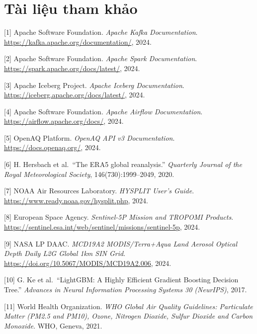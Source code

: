 \documentclass[12pt,a4paper]{article}
\begin{document}
\newpage
\section{Tài liệu tham khảo}\label{tuxe0i-liux1ec7u-tham-khux1ea3o}

{[}1{]} Apache Software Foundation. \emph{Apache Kafka Documentation}. \url{https://kafka.apache.org/documentation/}, 2024.

{[}2{]} Apache Software Foundation. \emph{Apache Spark Documentation}. \url{https://spark.apache.org/docs/latest/}, 2024.

{[}3{]} Apache Iceberg Project. \emph{Apache Iceberg Documentation}. \url{https://iceberg.apache.org/docs/latest/}, 2024.

{[}4{]} Apache Software Foundation. \emph{Apache Airflow Documentation}. \url{https://airflow.apache.org/docs/}, 2024.

{[}5{]} OpenAQ Platform. \emph{OpenAQ API v3 Documentation}. \url{https://docs.openaq.org/}, 2024.

{[}6{]} H. Hersbach et al.~``The ERA5 global reanalysis.'' \emph{Quarterly Journal of the Royal Meteorological Society}, 146(730):1999--2049, 2020.

{[}7{]} NOAA Air Resources Laboratory. \emph{HYSPLIT User's Guide}. \url{https://www.ready.noaa.gov/hysplit.php}, 2024.

{[}8{]} European Space Agency. \emph{Sentinel-5P Mission and TROPOMI Products}. \url{https://sentinel.esa.int/web/sentinel/missions/sentinel-5p}, 2024.

{[}9{]} NASA LP DAAC. \emph{MCD19A2 MODIS/Terra+Aqua Land Aerosol Optical Depth Daily L2G Global 1km SIN Grid}. \url{https://doi.org/10.5067/MODIS/MCD19A2.006}, 2024.

{[}10{]} G. Ke et al.~``LightGBM: A Highly Efficient Gradient Boosting Decision Tree.'' \emph{Advances in Neural Information Processing Systems 30 (NeurIPS)}, 2017.

{[}11{]} World Health Organization. \emph{WHO Global Air Quality Guidelines: Particulate Matter (PM2.5 and PM10), Ozone, Nitrogen Dioxide, Sulfur Dioxide and Carbon Monoxide}. WHO, Geneva, 2021.
\end{document}

